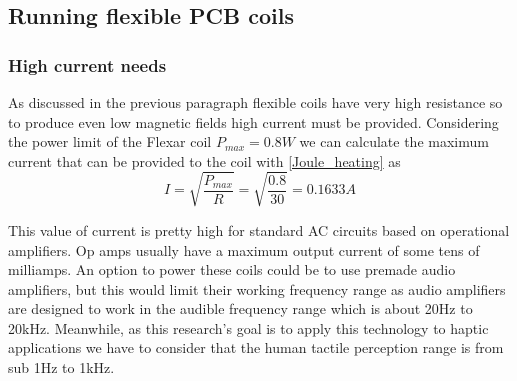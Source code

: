 \subsection{Running flexible PCB coils}

\subsubsection{High current needs}
As discussed in the previous paragraph flexible coils have very high resistance so to produce even low magnetic fields high current must be provided.
Considering the power limit of the Flexar coil $P_{max} = 0.8W$ we can calculate the maximum current that can be provided to the coil with \eqref{Joule_heating} as
\begin{equation}
    I = \sqrt{\frac{P_{max}}{R}} = \sqrt{\frac{0.8}{30}} = 0.1633A
\end{equation}

This value of current is pretty high for standard AC circuits based on operational amplifiers.
Op amps usually have a maximum output current of some tens of milliamps.
An option to power these coils could be to use premade audio amplifiers, but this would limit their working frequency range as audio amplifiers are designed to work in the audible frequency range which is about 20Hz to 20kHz.
Meanwhile, as this research's goal is to apply this technology to haptic applications we have to consider that the human tactile perception range is from sub 1Hz to 1kHz.